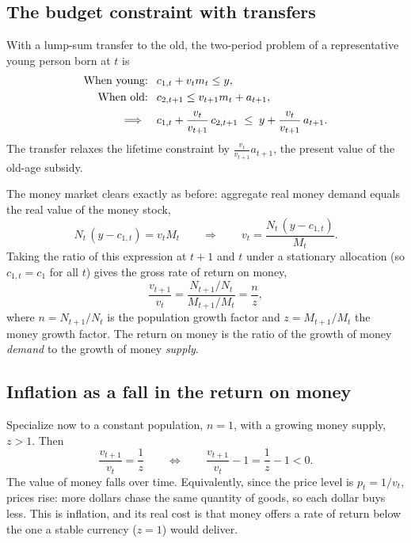 
\subsection*{The budget constraint with transfers}

With a lump-sum transfer to the old, the two-period problem of a representative young person born at $t$ is
\[
\begin{aligned}
\text{When young: }&\ c_{1,t} + v_t m_t \le y,\\
\text{When old: }&\ c_{2,t+1} \le v_{t+1} m_t + a_{t+1},\\[2pt]
\Longrightarrow\quad &\ c_{1,t} + \frac{v_t}{v_{t+1}}\,c_{2,t+1}
   \;\le\; y + \frac{v_t}{v_{t+1}}\,a_{t+1}.
\end{aligned}
\]
The transfer relaxes the lifetime constraint by $\tfrac{v_t}{v_{t+1}} a_{t+1}$, the present value of the old-age subsidy.

The money market clears exactly as before: aggregate real money demand equals the real value of the money stock,
\[
N_t\,(y - c_{1,t}) = v_t M_t
\qquad\Longrightarrow\qquad
v_t = \frac{N_t\,(y - c_{1,t})}{M_t}.
\]
Taking the ratio of this expression at $t+1$ and $t$ under a stationary allocation (so $c_{1,t}=c_1$ for all $t$) gives the gross rate of return on money,
\[
\frac{v_{t+1}}{v_t} = \frac{N_{t+1}/N_t}{M_{t+1}/M_t} = \frac{n}{z},
\]
where $n = N_{t+1}/N_t$ is the population growth factor and $z = M_{t+1}/M_t$ the money growth factor. The return on money is the ratio of the growth of money \emph{demand} to the growth of money \emph{supply}.

\subsection*{Inflation as a fall in the return on money}

Specialize now to a constant population, $n=1$, with a growing money supply, $z>1$. Then
\[
\frac{v_{t+1}}{v_t} = \frac{1}{z}
\qquad\Longleftrightarrow\qquad
\frac{v_{t+1}}{v_t} - 1 = \frac{1}{z} - 1 < 0 .
\]
The value of money falls over time. Equivalently, since the price level is $p_t = 1/v_t$, prices rise: more dollars chase the same quantity of goods, so each dollar buys less. This is inflation, and its real cost is that money offers a rate of return below the one a stable currency ($z=1$) would deliver.

